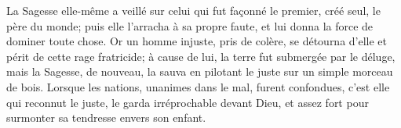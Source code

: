La Sagesse elle-même a veillé sur celui qui fut façonné le premier,
	créé seul, le père du monde;
	puis elle l’arracha à sa propre faute,
	et lui donna la force de dominer toute chose.
Or un homme injuste, pris de colère, se détourna d’elle et périt de cette rage fratricide;
	à cause de lui, la terre fut submergée par le déluge,
	mais la Sagesse, de nouveau, la sauva
		en pilotant le juste sur un simple morceau de bois.
Lorsque les nations, unanimes dans le mal, furent confondues,
	c’est elle qui reconnut le juste, le garda irréprochable devant Dieu,
	et assez fort pour surmonter sa tendresse envers son enfant.
